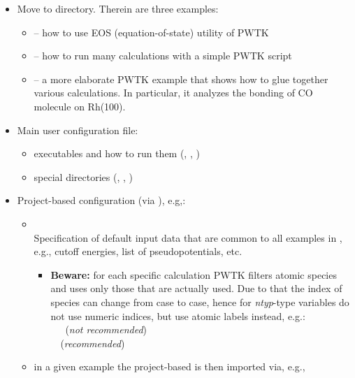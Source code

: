 \documentclass[landscape]{foils}
\begin{document}
\begin{itemize}
\item  Move to  directory. Therein are three
  examples:
  \begin{itemize}
  \item {} -- how to use EOS (equation-of-state) utility
    of PWTK
    \vspace{0.5em}
  \item {} -- how to run many calculations with a
    simple PWTK script
    \vspace{0.5em}
  \item {} -- a more elaborate PWTK example that
    shows how to glue together various calculations. In particular, it
    analyzes the bonding of CO molecule on Rh(100).
  \end{itemize}
\end{itemize}

\rightheader{}

\begin{itemize}
\item Main user configuration file: 
  \begin{itemize}
  \item executables and how to run them (, ,
    )
  \item special directories (, , )
  \end{itemize}
\item Project-based configuration (via ), e.g,:  
  \begin{itemize}
  \item {}\\[0.3em]
    Specification of default input data that are common to all examples in
    , e.g., cutoff energies, list of
    pseudopotentials, etc.
    \vspace{0.5em}
    {\small
      \begin{itemize}
      \item {\bf Beware:} for each specific calculation PWTK filters atomic
        species and uses only those that are actually used. Due to that
        the index of species can change from case to case, hence for
        {\em ntyp}-type variables do not use numeric indices, but use
        atomic labels instead, e.g.:\\
         ~~~({\burgundy\em not recommended})\\
         ~~({\green\em recommended})
      \end{itemize}
    }
    \vspace{0.5em}
  \item in a given example the project-based  is
    then imported via, e.g.,
  \end{itemize}
\end{itemize}
\end{document}
